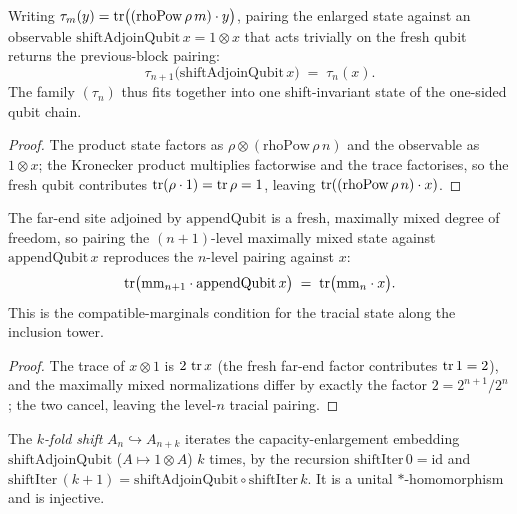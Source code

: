 \begin{theorem}\label{rhoPow_shiftAdjoinQubit_pairing}
  \leanok
  Writing \(\tau_m(y)=\operatorname{tr}\bigl((\mathrm{rhoPow}\,\rho\,m)\cdot y\bigr)\), pairing the enlarged state
  against an observable \(\mathrm{shiftAdjoinQubit}\,x=1\otimes x\) that acts trivially on the fresh
  qubit returns the previous-block pairing:
  \[
    \tau_{n+1}\bigl(\mathrm{shiftAdjoinQubit}\,x\bigr) \;=\; \tau_n(x).
  \]
  The family \((\tau_n)\) thus fits together into one shift-invariant state of the one-sided qubit
  chain.
\end{theorem}
\begin{proof}\leanok
  The product state factors as \(\rho\otimes(\mathrm{rhoPow}\,\rho\,n)\) and the observable as
  \(1\otimes x\); the Kronecker product multiplies factorwise and the trace factorises, so the fresh
  qubit contributes \(\operatorname{tr}(\rho\cdot 1)=\operatorname{tr}\rho=1\), leaving \(\operatorname{tr}((\mathrm{rhoPow}\,\rho\,n)\cdot x)\).
\end{proof}

\begin{theorem}\label{appendQubit_maximallyMixed_pairing}
  \leanok
  The far-end site adjoined by \(\mathrm{appendQubit}\) is a fresh, maximally mixed degree of freedom,
  so pairing the \((n+1)\)-level maximally mixed state against \(\mathrm{appendQubit}\,x\) reproduces
  the \(n\)-level pairing against \(x\):
  \[
    \operatorname{tr}\bigl(\mathrm{mm}_{n+1}\cdot\mathrm{appendQubit}\,x\bigr)
      \;=\; \operatorname{tr}\bigl(\mathrm{mm}_{n}\cdot x\bigr).
  \]
  This is the compatible-marginals condition for the tracial state along the inclusion tower.
\end{theorem}
\begin{proof}\leanok
  The trace of \(x\otimes 1\) is \(2\,\operatorname{tr} x\) (the fresh far-end factor contributes \(\operatorname{tr} 1=2\)), and
  the maximally mixed normalizations differ by exactly the factor \(2 = 2^{n+1}/2^{n}\); the two
  cancel, leaving the level-\(n\) tracial pairing.
\end{proof}

\begin{definition}\label{shiftIter}
  \leanok
  The \emph{\(k\)-fold shift} \(A_n\hookrightarrow A_{n+k}\) iterates the capacity-enlargement
  embedding \(\mathrm{shiftAdjoinQubit}\) (\(A\mapsto 1\otimes A\)) \(k\) times, by the recursion
  \(\mathrm{shiftIter}\,0=\mathrm{id}\) and
  \(\mathrm{shiftIter}\,(k+1)=\mathrm{shiftAdjoinQubit}\circ\mathrm{shiftIter}\,k\). It is a unital
  \(*\)-homomorphism and is injective.
\end{definition}

